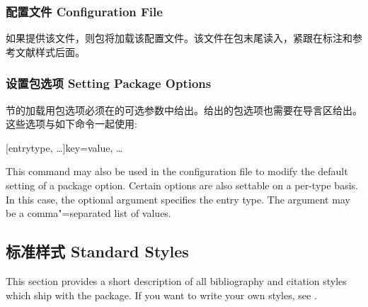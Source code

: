 
\subsubsection{配置文件 Configuration File}
\label{use:cfg:cfg}
如果提供该文件，则包将加载该配置文件。该文件在包末尾读入，紧跟在标注和参考文献样式后面。

\subsubsection{设置包选项 Setting Package Options}
\label{use:cfg:opt}
节的加载用包选项必须在的可选参数中给出。给出的包选项也需要在导言区给出。这些选项与如下命令一起使用:

\begin{ltxsyntax}

[entrytype, \dots]{key=value, \dots}

This command may also be used in the configuration file to modify the default setting of a package option. Certain options are also settable on a per-type basis. In this case, the optional  argument specifies the entry type. The  argument may be a comma"=separated list of values.

\end{ltxsyntax}

\subsection{标准样式 Standard Styles}
\label{use:xbx}

This section provides a short description of all bibliography and citation styles which ship with the \biblatex package. If you want to write your own styles, see .

